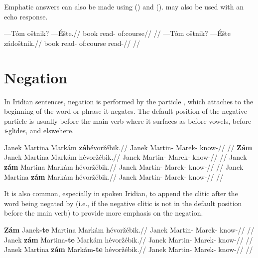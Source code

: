Emphatic answers can also be made using  () and   ().  may also be used with an echo response.

\pex
\a
\begingl
\gla ---T\'om o\v{s}tnik? ---\'E\v{s}te.//
\glb book read- of:course//
\glft {}//
\endgl
\a
\begingl
\gla ---T\'om o\v{s}tnik? ---\'E\v{s}te z\'ado\v{s}tnik.//
\glb book read- of:course read-//
\glft {}//
\endgl
\xe

\section{Negation}

In Iridian sentences, negation is performed by the particle , which attaches to the beginning of the word or phrase  it negates. The default position of the negative particle is usually before the main verb where it surfaces as  before vowels,  before \emph{i}-glides, and  elswehere.

\pex
\a
\begingl
    \gla Janek Martina Mark\'am \textbf{z\'a}h\'evor\v{z}\'ebik.//
    \glb Janek Martin- Marek- know-//
    \glft {}//
\endgl
\a
\begingl
    \gla \textbf{Z\'am} Janek Martina Mark\'am h\'evor\v{z}\'ebik.//
    \glb {} Janek Martin- Marek- know-//
    \glft {}//
\endgl
\a
\begingl
    \gla Janek \textbf{z\'am} Martina Mark\'am h\'evor\v{z}\'ebik.//
    \glb Janek  Martin- Marek- know-//
    \glft {}//
\endgl
\a
\begingl
    \gla Janek Martina \textbf{z\'am} Mark\'am h\'evor\v{z}\'ebik.//
    \glb Janek Martin-  Marek- know-//
    \glft {}//
\endgl
\xe

It is also common, especially in spoken Iridian, to append the clitic 
after the word being negated by  (i.e., if the negative clitic is not
in the default position before the main verb) to provide more emphasis on the
negation.

\pex
\a
\begingl
    \gla \textbf{Z\'am} Janek\textbf{-te} Martina Mark\'am h\'evor\v{z}\'ebik.//
    \glb {} Janek Martin- Marek- know-//
    \glft {}//
\endgl
\a
\begingl
    \gla Janek \textbf{z\'am} Martina\textbf{-te} Mark\'am h\'evor\v{z}\'ebik.//
    \glb Janek  Martin- Marek- know-//
    \glft {}//
\endgl
\a
\begingl
    \gla Janek Martina \textbf{z\'am} Mark\'am\textbf{-te} h\'evor\v{z}\'ebik.//
    \glb Janek Martin-  Marek- know-//
    \glft {}//
\endgl
\xe

